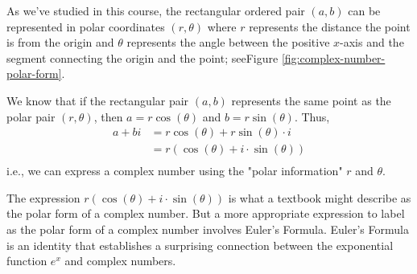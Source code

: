     
      As we've studied in this course, the rectangular ordered pair $\left( a,b\right)$ can be represented in polar coordinates $\left( r,\theta \right)$ where $r$ represents the distance the point is from the origin and $\theta$ represents the angle between the positive $x$-axis and the segment connecting the origin and the point; seeFigure \ref{fig:complex-number-polar-form}.
    

    \begin{center}
     \label{fig:complex-number-polar-form}
      \captionsetup{type=figure} 
      
          
          
        
      \end{center}
    
      We know that if the rectangular pair $\left( a,b\right)$ represents the same point as the polar pair $ \left( r,\theta \right)$, then $a=r\cos(\theta)$ and $b=r\sin(\theta)$.  Thus,
      \begin{align*}
        a+bi &=r\cos(\theta)+r\sin(\theta) \cdot i\\
         &=r \left( \cos \left( \theta \right)+i\cdot\sin \left( \theta \right)\right)\\
      \end{align*}
      i.e., we can express a complex number using the "polar information" $r$ and $\theta$.
    
    
      The expression $r \left( \cos \left( \theta \right)+i\cdot\sin \left( \theta \right)\right)$ is what a textbook might describe as the polar form of a complex number.  But a more appropriate expression to label as the polar form of a complex number involves Euler's Formula. Euler's Formula is an identity that establishes a surprising connection between the exponential function $e^x$ and complex numbers.
    
